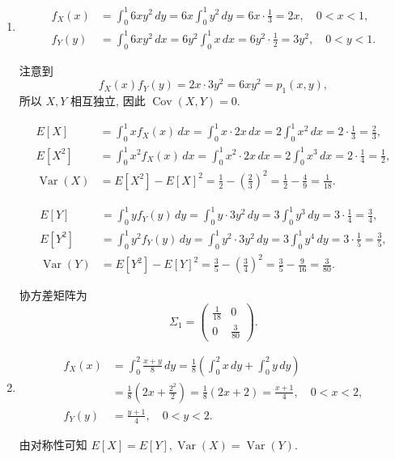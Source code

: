 \documentclass[../main.tex]{subfiles}
\begin{document}
\begin{solution}
  \begin{enumerate}
    \item \[
\begin{aligned}
f_X(x)&=\int_0^1 6xy^2\,dy=6x\int_0^1 y^2\,dy=6x\cdot\frac13=2x,\quad 0<x<1,\\
f_Y(y)&=\int_0^1 6xy^2\,dx=6y^2\int_0^1 x\,dx=6y^2\cdot\frac12=3y^2,\quad 0<y<1.
\end{aligned}
\]

注意到
\[
f_X(x)f_Y(y)=2x\cdot 3y^2=6xy^2=p_1(x,y),
\]
所以 \(X,Y\) 相互独立, 因此 \(\operatorname{Cov}(X,Y)=0\).

\[
\begin{aligned}
E[X]&=\int_0^1 x f_X(x)\,dx=\int_0^1 x\cdot 2x\,dx
=2\int_0^1 x^2\,dx=2\cdot\frac13=\frac23,\\
E[X^2]&=\int_0^1 x^2 f_X(x)\,dx=\int_0^1 x^2\cdot 2x\,dx
=2\int_0^1 x^3\,dx=2\cdot\frac14=\frac12,\\
\operatorname{Var}(X)&=E[X^2]-E[X]^2=\frac12-\left(\frac23\right)^2
=\frac12-\frac49=\frac1{18}.
\end{aligned}
\]

\[
\begin{aligned}
E[Y]&=\int_0^1 y f_Y(y)\,dy=\int_0^1 y\cdot 3y^2\,dy
=3\int_0^1 y^3\,dy=3\cdot\frac14=\frac34,\\
E[Y^2]&=\int_0^1 y^2 f_Y(y)\,dy=\int_0^1 y^2\cdot 3y^2\,dy
=3\int_0^1 y^4\,dy=3\cdot\frac15=\frac35,\\
\operatorname{Var}(Y)&=E[Y^2]-E[Y]^2=\frac35-\left(\frac34\right)^2
=\frac35-\frac9{16}=\frac3{80}.
\end{aligned}
\]

协方差矩阵为
\[
\Sigma_1=
\begin{pmatrix}
\frac1{18} & 0\\[4pt]
0 & \frac3{80}
\end{pmatrix}.
\]
\item \[
\begin{aligned}
f_X(x)
&=\int_0^2 \frac{x+y}{8}\,dy
=\frac18\left(\int_0^2 x\,dy+\int_0^2 y\,dy\right)\\
&=\frac18\left(2x+\frac{2^2}{2}\right)
=\frac18(2x+2)=\frac{x+1}{4},\quad 0<x<2,\\[4pt]
f_Y(y)&=\frac{y+1}{4},\quad 0<y<2.
\end{aligned}
\]

由对称性可知 \(E[X]=E[Y], \operatorname{Var}(X)=\operatorname{Var}(Y)\).


\end{enumerate}
\end{solution}
\end{document}
